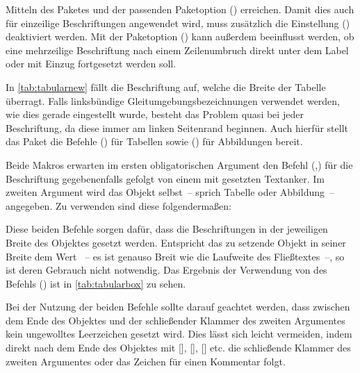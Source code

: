 \documentclass[%
  english,ngerman,%
  cdgeometry=no,DIV=12,automark,%
]{tudscrartcl}
\begin{document}
Mitteln des Paketes  und der passenden Paketoption 
() erreichen. Damit dies auch für 
einzeilige Beschriftungen angewendet wird, muss zusätzlich die Einstellung 
() deaktiviert werden. Mit der 
Paketoption () kann außerdem beeinflusst 
werden, ob eine mehrzeilige Beschriftung nach einem Zeilenumbruch direkt unter 
dem Label oder mit Einzug fortgesetzt werden soll.
%
\begin{Preamble*}
\captionsetup{singlelinecheck=off,format=hang,justification=raggedright}
\end{Preamble*}
%
In \autoref{tab:tabularnew} fällt die Beschriftung auf, welche die Breite der 
Tabelle überragt. Falls linksbündige Gleitumgebungsbezeichnungen verwendet 
werden, wie dies gerade eingestellt wurde, besteht das Problem quasi bei jeder 
Beschriftung, da diese immer am linken Seitenrand beginnen. Auch hierfür stellt 
das Paket  die Befehle () 
für Tabellen sowie () für Abbildungen bereit. 

Beide Makros erwarten im ersten obligatorischen Argument den Befehl 
(,) für die Beschriftung 
gegebenenfalls gefolgt von einem mit  gesetzten Textanker. Im 
zweiten Argument wird das Objekt selbst~-- sprich Tabelle oder Abbildung~-- 
angegeben. Zu verwenden sind diese folgendermaßen:
%
%
Diese beiden Befehle sorgen dafür, dass die Beschriftungen in der jeweiligen 
Breite des Objektes gesetzt werden. Entspricht das zu setzende Objekt in seiner 
Breite dem Wert ~-- es ist genauso Breit wie die Laufweite 
des Fließtextes~--, so ist deren Gebrauch nicht notwendig. Das Ergebnis der 
Verwendung von des Befehls () ist in 
\autoref{tab:tabularbox} zu sehen.

Bei der Nutzung der beiden Befehle sollte darauf geachtet werden, dass zwischen 
dem Ende des Objektes und der schließender Klammer des zweiten Argumentes kein 
ungewolltes Leerzeichen gesetzt wird. Dies lässt sich leicht vermeiden, indem 
direkt nach dem Ende des Objektes mit [], 
[], [] etc. die 
schließende Klammer des zweiten Argumentes oder das Zeichen für einen Kommentar 
\PValue{\%} folgt.
\end{document}

